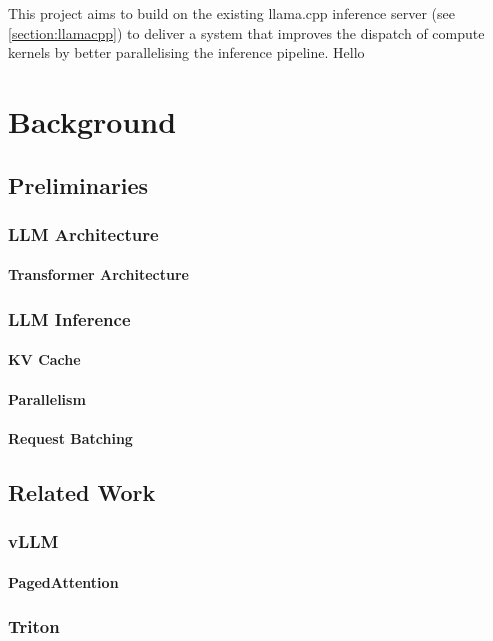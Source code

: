 \documentclass[12pt,twoside]{report}
\begin{document}
This project aims to build on the existing llama.cpp inference server (see \ref{section:llamacpp}) to deliver a system that improves the dispatch of compute kernels by better parallelising the inference pipeline.
Hello ~\cite{einstein}

\chapter{Background} %
\section{Preliminaries}
\subsection{LLM Architecture}
\subsubsection{Transformer Architecture}

\subsection{LLM Inference}
\subsubsection{KV Cache}
\subsubsection{Parallelism}
\subsubsection{Request Batching}

\section{Related Work}
\subsection{vLLM}
\subsubsection{PagedAttention}
\subsection{Triton}
\end{document}
